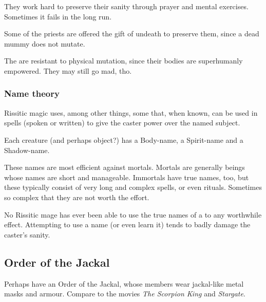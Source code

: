 They work hard to preserve their sanity through prayer and mental exercises. Sometimes it fails in the long run. 

Some of the priests are offered the gift of undeath to preserve them, since a dead mummy does not mutate. 

The \Ashenoch{} are resistant to physical mutation, since their bodies are superhumanly empowered. They may still go mad, tho. 





\subsubsection{Name theory}
Rissitic magic uses, among other things, some  that, when known, can be used in spells (spoken or written) to give the caster power over the named subject. 

Each creature (and perhaps object?) has a Body-name, a Spirit-name and a Shadow-name. 

These names are most efficient against mortals. 
Mortals are generally  beings whose names are short and manageable. 
Immortals have true names, too, but these typically consist of very long and complex spells, or even rituals. 
Sometimes so complex that they are not worth the effort. 

No Rissitic mage has ever been able to use the true names of a \bane{} to any worthwhile effect. 
Attempting to use a \banez{} name (or even learn it) tends to badly damage the caster's sanity. 









\subsection{Order of the Jackal}
Perhaps have an Order of the Jackal, whose members wear jackal-like metal masks and armour. Compare to the movies \emph{The Scorpion King} and \emph{Stargate}. 










